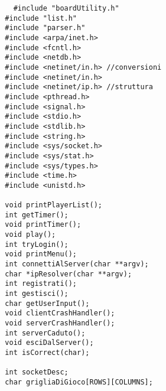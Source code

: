 \begin{lstlisting}
    #include "boardUtility.h"
  #include "list.h"
  #include "parser.h"
  #include <arpa/inet.h>
  #include <fcntl.h>
  #include <netdb.h>
  #include <netinet/in.h> //conversioni
  #include <netinet/in.h>
  #include <netinet/ip.h> //struttura
  #include <pthread.h>
  #include <signal.h>
  #include <stdio.h>
  #include <stdlib.h>
  #include <string.h>
  #include <sys/socket.h>
  #include <sys/stat.h>
  #include <sys/types.h>
  #include <time.h>
  #include <unistd.h>
  
  void printPlayerList();
  int getTimer();
  void printTimer();
  void play();
  int tryLogin();
  void printMenu();
  int connettiAlServer(char **argv);
  char *ipResolver(char **argv);
  int registrati();
  int gestisci();
  char getUserInput();
  void clientCrashHandler();
  void serverCrashHandler();
  int serverCaduto();
  void esciDalServer();
  int isCorrect(char);
  
  int socketDesc;
  char grigliaDiGioco[ROWS][COLUMNS];
  

\end{lstlisting}

